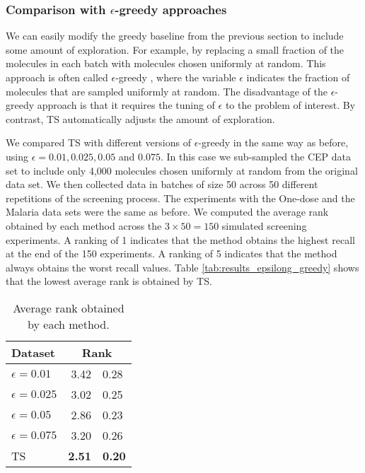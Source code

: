 \subsubsection{Comparison with $\epsilon$-greedy approaches}

We can easily modify the greedy baseline from the previous section to include some amount of exploration. For example, by replacing a small fraction of the molecules in each batch with molecules chosen uniformly at random. This approach is often called $\epsilon$-greedy \cite{watkins1989learning}, where the variable $\epsilon$ indicates the fraction of molecules that are sampled uniformly at random. The disadvantage of the $\epsilon$-greedy approach is that it requires the tuning of $\epsilon$ to the problem of interest. By contrast, TS automatically adjusts the amount of exploration. 

We compared TS with different versions of $\epsilon$-greedy in the same way as before, using $\epsilon = 0.01, 0.025, 0.05$ and $0.075$. In this case we sub-sampled the CEP data set to include only 4,000 molecules chosen uniformly at random from the original data set. We then collected data in batches of size 50 across 50 different repetitions of the screening process. The experiments with the One-dose and the Malaria data sets were the same as before.  We computed the average rank obtained by each method across the $3\times 50 = 150$ simulated screening experiments. A ranking of 1 indicates that the method obtains the highest recall at the end of the 150 experiments. A ranking of 5 indicates that the method always obtains the worst recall values. Table \ref{tab:results_epsilong_greedy} shows that the lowest average rank is obtained by TS. 

\begin{table}
\centering
\caption{Average rank obtained by each method.}\label{tab:results_epsilon_greedy}
\begin{tabular}{lr@{$\pm$}l}
\hline
\bf{Dataset}& \multicolumn{2}{c}{\bf{Rank}}\\
\hline
$\epsilon = 0.01$ & 3.42 & 0.28 \\
$\epsilon = 0.025$ & 3.02 & 0.25 \\
$\epsilon = 0.05$ & 2.86 & 0.23 \\
$\epsilon = 0.075$ & 3.20 & 0.26 \\
TS & \bf{ 2.51 }&\bf{ 0.20 } \\
\hline
\end{tabular}
\end{table}